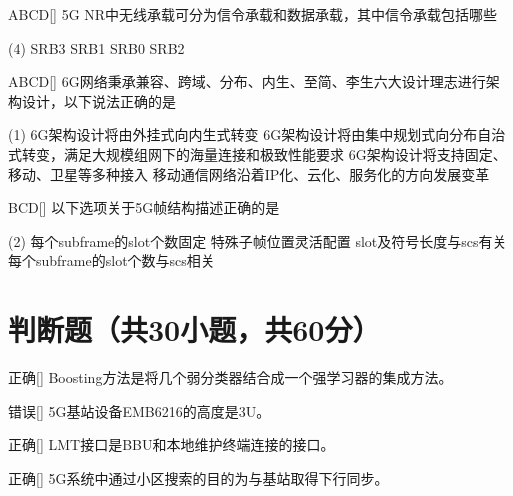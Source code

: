 \begin{choice}{\;ABCD\;}[]
    5G NR中无线承载可分为信令承载和数据承载，其中信令承载包括哪些
    \begin{tasks}(4)
        \task SRB3
        \task SRB1
        \task SRB0
        \task SRB2
    \end{tasks}
\end{choice}


\begin{choice}{\;ABCD\;}[]
    6G网络秉承兼容、跨域、分布、内生、至简、李生六大设计理志进行架构设计，以下说法正确的是
    \begin{tasks}(1)
        \task 6G架构设计将由外挂式向内生式转变
        \task 6G架构设计将由集中规划式向分布自治式转变，满足大规模组网下的海量连接和极致性能要求
        \task 6G架构设计将支持固定、移动、卫星等多种接入
        \task 移动通信网络沿着IP化、云化、服务化的方向发展变革
    \end{tasks}
\end{choice}


\begin{choice}{\;BCD\;}[]
    以下选项关于5G帧结构描述正确的是
    \begin{tasks}(2)
        \task 每个subframe的slot个数固定
        \task 特殊子帧位置灵活配置
        \task slot及符号长度与scs有关
        \task 每个subframe的slot个数与scs相关
    \end{tasks}
\end{choice}


\section{判断题（共30小题，共60分）}

\begin{choice}{\;正确\;}[]
    Boosting方法是将几个弱分类器结合成一个强学习器的集成方法。
\end{choice}


\begin{choice}{\;错误\;}[]
    5G基站设备EMB6216的高度是3U。
\end{choice}

\begin{choice}{\;正确\;}[]
    LMT接口是BBU和本地维护终端连接的接口。
\end{choice}

\begin{choice}{\;正确\;}[]
    5G系统中通过小区搜索的目的为与基站取得下行同步。
\end{choice}



